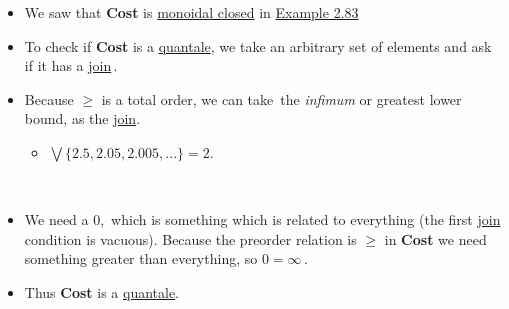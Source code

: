 \begin{itemize}
    \item  We saw that \textbf{Cost} is \hyperref[D2.79]{monoidal closed} in \hyperref[X2.83]{Example 2.83}
    \item To check if \textbf{Cost} is a \hyperref[D2.90]{quantale}, we take an arbitrary set of elements and ask \,if it has a \hyperref[D1.81]{join}\,.
    \item Because $\geq$ is a total order, we can take \,the \emph{infimum} or greatest lower bound, as the \hyperref[D1.81]{join}.
          \begin{itemize}
            \item $\bigvee\{2.5,2.05,2.005,...\} = 2$.
          \end{itemize}\,
    \item We need a $0$, \,which is something which is related to everything (the first \hyperref[D1.81]{join} condition is vacuous). Because the preorder relation is $\geq$ in \textbf{Cost} we need something greater than everything, so $0 = \infty$\,.
    \item Thus \textbf{Cost} is a \hyperref[D2.90]{quantale}.
  \end{itemize}